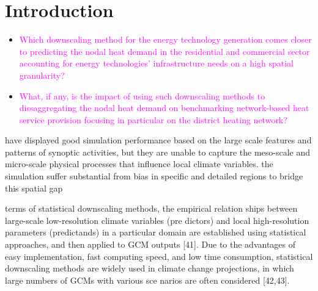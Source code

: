 \section{Introduction}

\begin{itemize}
	\item \textcolor{magenta}{Which downscaling method for the energy technology generation comes closer to predicting the nodal heat demand in the residential and commercial sector accounting for energy technologies' infrastructure needs on a high spatial granularity?}
	
	\item \textcolor{magenta}{What, if any, is the impact of using such downscaling methods to dissaggregating the nodal heat demand on benchmarking network-based heat service provision focusing in particular on the district heating network?}
	
\end{itemize}
have displayed good simulation performance based on the large scale features and patterns of synoptic activities, but they are unable to capture the meso-scale and micro-scale physical processes that influence local climate variables.
the simulation suffer substantial from bias in specific and detailed regions
to bridge this spatial gap 

terms of statistical downscaling methods, the empirical relation
ships
between large-scale low-resolution climate variables (pre
dictors)
and local high-resolution parameters (predictands) in a
particular domain are established using statistical approaches, and
then applied to GCM outputs [41]. Due to the advantages of easy
implementation, fast computing speed, and low time consumption,
statistical downscaling methods are widely used in climate change
projections, in which large numbers of GCMs with various sce
narios
are often considered [42,43].